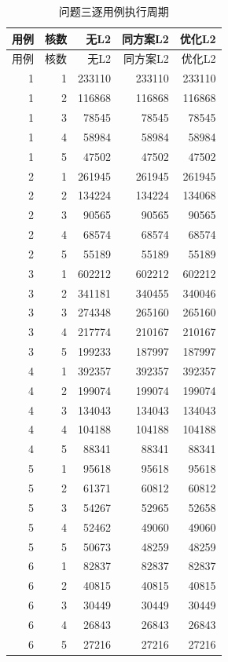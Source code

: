 \begin{longtable}{rrrrr}
\caption{问题三逐用例执行周期}\label{tab:q3-time}\\
\toprule 用例 & 核数 & 无L2 & 同方案L2 & 优化L2\\\midrule
\endfirsthead
\toprule 用例 & 核数 & 无L2 & 同方案L2 & 优化L2\\\midrule
\endhead
1 & 1 & 233110 & 233110 & 233110 \\
1 & 2 & 116868 & 116868 & 116868 \\
1 & 3 & 78545 & 78545 & 78545 \\
1 & 4 & 58984 & 58984 & 58984 \\
1 & 5 & 47502 & 47502 & 47502 \\
2 & 1 & 261945 & 261945 & 261945 \\
2 & 2 & 134224 & 134224 & 134068 \\
2 & 3 & 90565 & 90565 & 90565 \\
2 & 4 & 68574 & 68574 & 68574 \\
2 & 5 & 55189 & 55189 & 55189 \\
3 & 1 & 602212 & 602212 & 602212 \\
3 & 2 & 341181 & 340455 & 340046 \\
3 & 3 & 274348 & 265160 & 265160 \\
3 & 4 & 217774 & 210167 & 210167 \\
3 & 5 & 199233 & 187997 & 187997 \\
4 & 1 & 392357 & 392357 & 392357 \\
4 & 2 & 199074 & 199074 & 199074 \\
4 & 3 & 134043 & 134043 & 134043 \\
4 & 4 & 104188 & 104188 & 104188 \\
4 & 5 & 88341 & 88341 & 88341 \\
5 & 1 & 95618 & 95618 & 95618 \\
5 & 2 & 61371 & 60812 & 60812 \\
5 & 3 & 54267 & 52965 & 52658 \\
5 & 4 & 52462 & 49060 & 49060 \\
5 & 5 & 50673 & 48259 & 48259 \\
6 & 1 & 82837 & 82837 & 82837 \\
6 & 2 & 40815 & 40815 & 40815 \\
6 & 3 & 30449 & 30449 & 30449 \\
6 & 4 & 26843 & 26843 & 26843 \\
6 & 5 & 27216 & 27216 & 27216 \\

\end{longtable}
